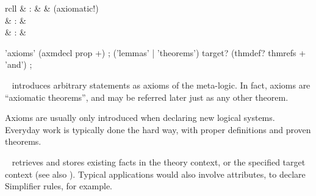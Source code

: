 \begin{isabellebody}
\begin{isamarkuptext}
\begin{description}
  \end{description}%
\end{isamarkuptext}%
\isamarkuptrue%
%
\isamarkuptrue%
%
\begin{isamarkuptext}%
\begin{matharray}{rcll}
    \hypertarget{command.axioms}{\hyperlink{command.axioms}{\mbox{}}} & : &  & (axiomatic!) \\
    \hypertarget{command.lemmas}{\hyperlink{command.lemmas}{\mbox{}}} & : &  \\
    \hypertarget{command.theorems}{\hyperlink{command.theorems}{\mbox{}}} & : &  \\
  \end{matharray}

  \begin{rail}
    'axioms' (axmdecl prop +)
    ;
    ('lemmas' | 'theorems') target? (thmdef? thmrefs + 'and')
    ;
  \end{rail}

  \begin{description}
  
  \item \hyperlink{command.axioms}{\mbox{}}~ introduces arbitrary
  statements as axioms of the meta-logic.  In fact, axioms are
  ``axiomatic theorems'', and may be referred later just as any other
  theorem.
  
  Axioms are usually only introduced when declaring new logical
  systems.  Everyday work is typically done the hard way, with proper
  definitions and proven theorems.
  
  \item \hyperlink{command.lemmas}{\mbox{}}~ retrieves and stores
  existing facts in the theory context, or the specified target
  context (see also ).  Typical applications would
  also involve attributes, to declare Simplifier rules, for example.
  

\end{description}
\end{isamarkuptext}
\end{isabellebody}
